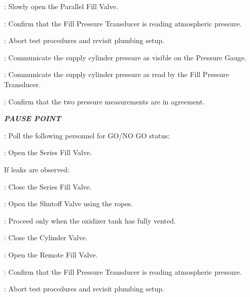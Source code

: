 \begin{checklist}
\begin{checklist}[label=$\bullet$]
\begin{checklist}
            \item \primary{}: Slowly open the Parallel Fill Valve.
            \item \daq{}: Confirm that the Fill Pressure Transducer is reading atmospheric pressure.
            \item \ops{}: Abort test procedures and revisit plumbing setup.
        \end{checklist}
    \end{checklist}
    \item \primary{}: Communicate the supply cylinder pressure as visible on the Pressure Gauge.
    \item \daq{}: Communicate the supply cylinder pressure as read by the Fill Pressure Transducer.
    \item \daq{}: Confirm that the two pressure measurements are in agreement.
    \item \textbf{\textit{PAUSE POINT}}
    \item \ops{}: Poll the following personnel for GO/NO GO status:
    \begin{checklist}
        \item \peri{}
        \item \perii{}
        \item \heat
        \item \daq{}
        \item \primary{}
        \item \secondary
    \end{checklist}
    \item \primary{}: Open the Series Fill Valve.
    \begin{checklist}[label=$\bullet$]
        \item If leaks are observed:
        \begin{checklist}
            \item \primary{}: Close the Series Fill Valve.
            \item \primary{}: Open the Shutoff Valve using the ropes.
            \item \secondary: Proceed only when the oxidizer tank has fully vented.
            \item \primary{}: Close the Cylinder Valve.
            \item \primary{}: Open the Remote Fill Valve.
            \item \daq{}: Confirm that the Fill Pressure Transducer is reading atmospheric pressure.
            \item \ops{}: Abort test procedures and revisit plumbing setup.

\end{checklist}
\end{checklist}
\end{checklist}
